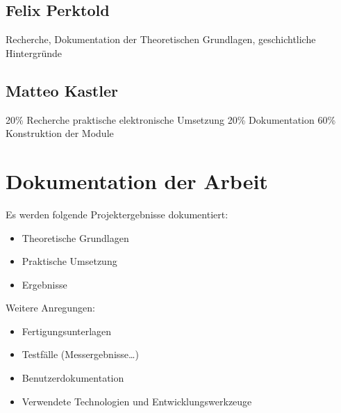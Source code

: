 \subsection{Felix Perktold}
Recherche, Dokumentation der Theoretischen Grundlagen, geschichtliche Hintergründe

\subsection{Matteo Kastler}
20\% Recherche praktische elektronische Umsetzung
20\% Dokumentation 
60\% Konstruktion der Module

\section{Dokumentation der Arbeit}

Es werden folgende Projektergebnisse dokumentiert:

\begin{itemize}
	\item Theoretische Grundlagen
	\item Praktische Umsetzung
	\item Ergebnisse
\end{itemize}

Weitere Anregungen:

\begin{itemize}
	\item Fertigungsunterlagen
	\item Testfälle (Messergebnisse…)
	\item Benutzerdokumentation
	\item Verwendete Technologien und Entwicklungswerkzeuge
\end{itemize}
